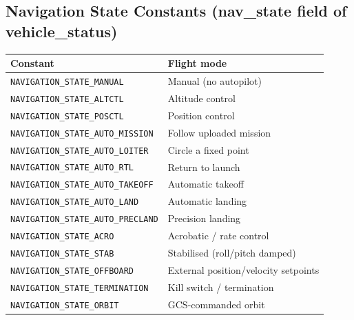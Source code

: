 \documentclass[12pt,a4paper]{article}
\begin{document}
\subsection*{Navigation State Constants (nav\_state field of vehicle\_status)}
\begin{center}\begin{tabular}{ll}\toprule
Constant & Flight mode \\\midrule
\texttt{NAVIGATION\_STATE\_MANUAL} & Manual (no autopilot) \\
\texttt{NAVIGATION\_STATE\_ALTCTL} & Altitude control \\
\texttt{NAVIGATION\_STATE\_POSCTL} & Position control \\
\texttt{NAVIGATION\_STATE\_AUTO\_MISSION} & Follow uploaded mission \\
\texttt{NAVIGATION\_STATE\_AUTO\_LOITER} & Circle a fixed point \\
\texttt{NAVIGATION\_STATE\_AUTO\_RTL} & Return to launch \\
\texttt{NAVIGATION\_STATE\_AUTO\_TAKEOFF} & Automatic takeoff \\
\texttt{NAVIGATION\_STATE\_AUTO\_LAND} & Automatic landing \\
\texttt{NAVIGATION\_STATE\_AUTO\_PRECLAND} & Precision landing \\
\texttt{NAVIGATION\_STATE\_ACRO} & Acrobatic / rate control \\
\texttt{NAVIGATION\_STATE\_STAB} & Stabilised (roll/pitch damped) \\
\texttt{NAVIGATION\_STATE\_OFFBOARD} & External position/velocity setpoints \\
\texttt{NAVIGATION\_STATE\_TERMINATION} & Kill switch / termination \\
\texttt{NAVIGATION\_STATE\_ORBIT} & GCS-commanded orbit \\
\bottomrule\end{tabular}\end{center}
\end{document}
